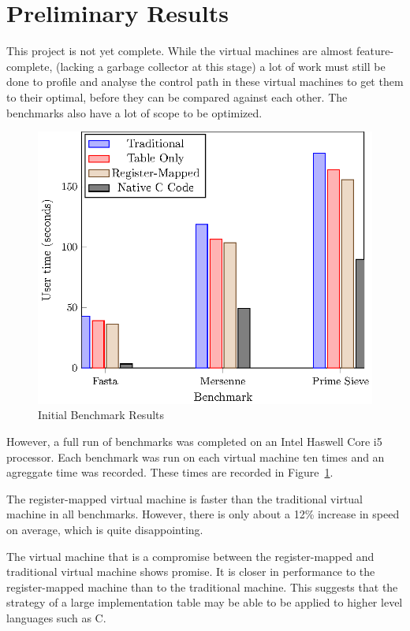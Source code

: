 \documentclass[A4]{sig-alternate}
\begin{document}
\section{Preliminary Results}
This project is not yet complete. While the virtual machines are almost feature-complete, (lacking a garbage collector at this stage) a lot of work must still be done to profile and analyse the control path in these virtual machines to get them to their optimal, before they can be compared against each other. The benchmarks also have a lot of scope to be optimized.
\begin{figure}
	\includegraphics{plot}
	\caption{Initial Benchmark Results}
	\label{fig:bench}
\end{figure}
However, a full run of benchmarks was completed on an Intel Haswell Core i5 processor. Each benchmark was run on each virtual machine ten times and an agreggate time was recorded. These times are recorded in Figure~\ref{fig:bench}.

The register-mapped virtual machine is faster than the traditional virtual machine in all benchmarks. However, there is only about a 12\% increase in speed on average, which is quite disappointing.


\sloppy %
The virtual machine that is a compromise between the register-mapped and traditional virtual machine shows promise. It is closer in performance to the register-mapped machine than to the traditional machine. This suggests that the strategy of a large implementation table may be able to be applied to higher level languages such as C. 
\end{document}
